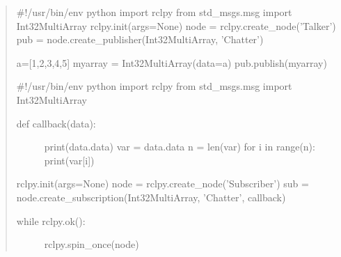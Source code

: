 \begin{quote}
\#!/usr/bin/env python import rclpy from std\_msgs.msg import
Int32MultiArray rclpy.init(args=None) node =
rclpy.create\_node('Talker') pub =
node.create\_publisher(Int32MultiArray, 'Chatter')

a={[}1,2,3,4,5{]} myarray = Int32MultiArray(data=a) pub.publish(myarray)

\#!/usr/bin/env python import rclpy from std\_msgs.msg import
Int32MultiArray

\begin{description}
\item[def callback(data):]
print(data.data) var = data.data n = len(var) for i in range(n):
print(var{[}i{]})
\end{description}

rclpy.init(args=None) node = rclpy.create\_node('Subscriber') sub =
node.create\_subscription(Int32MultiArray, 'Chatter', callback)

\begin{description}
\item[while rclpy.ok():]
rclpy.spin\_once(node)
\end{description}
\end{quote}

